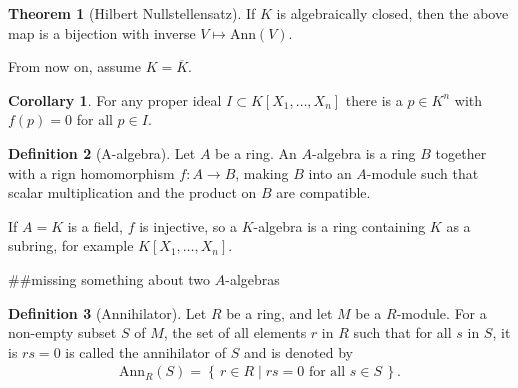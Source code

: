 \documentclass[a4paper]{book}
\theoremstyle{definition}
\newtheorem{definition}{Definition}[]
\newtheorem{theorem}[definition]{Theorem}
\newtheorem{corollary}{Corollary}
\newcommand{\makeset}[2]{\left\{\, #1 \mid #2 \,\right\}}
\begin{document}
\begin{thmbox}
    \begin{theorem}[Hilbert Nullstellensatz]
        If \(K\) is algebraically closed, then the above map is a bijection with inverse \(V \mapsto \text{Ann}(V)\).
    \end{theorem}
\end{thmbox}

From now on, assume \(K = \overline{K}\).
\begin{thmbox}    
    \begin{corollary}
        For any proper ideal \(I \subset K[X_1, \ldots, X_n]\) there is a \(p \in K^n\) with \(f(p) = 0\) for all \(p \in I\).
    \end{corollary}
\end{thmbox}

\begin{defbox}
    \begin{definition}[A-algebra]
        Let \(A\) be a ring. An \(A\)-algebra is a ring \(B\) together with a rign homomorphism \(f: A \longrightarrow B\), making \(B\) into an \(A\)-module such that scalar multiplication and the product on \(B\) are compatible.

        If \(A = K\) is a field, \(f\) is injective, so a \(K\)-algebra is a ring containing \(K\) as a subring, for example \(K[X_1, \ldots, X_n]\).

        \#\#missing something about two \(A\)-algebras
    \end{definition}
\end{defbox}

\begin{definition}[Annihilator]
    Let \(R\) be a ring, and let \(M\) be a \(R\)-module. For a non-empty subset \(S\) of \(M\), the set of all elements \(r\) in \(R\) such that for all \(s\) in \(S\), it is \(rs = 0\) is called the annihilator of \(S\) and is denoted by
    \begin{align*}
        \text{Ann}_R(S) = \makeset{r \in R}{rs = 0 \text{ for all } s \in S} \text{.}
    \end{align*}
\end{definition}
\end{document}
